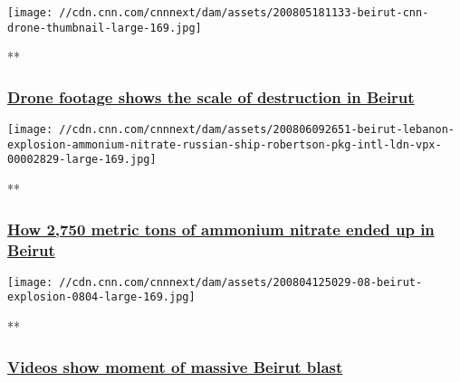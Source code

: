 \href{/videos/world/2020/08/05/beirut-explosion-lebanon-destruction-drone-video-lon-orig-bks.cnn/video/playlists/beirut-explosion/}{}

\texttt{[image: //cdn.cnn.com/cnnnext/dam/assets/200805181133-beirut-cnn-drone-thumbnail-large-169.jpg]}

**

\hypertarget{drone-footage-shows-the-scale-of-destruction-in-beirut}{%
\subsubsection{\texorpdfstring{\href{/videos/world/2020/08/05/beirut-explosion-lebanon-destruction-drone-video-lon-orig-bks.cnn/video/playlists/beirut-explosion/}{Drone
footage shows the scale of destruction in
Beirut}}{Drone footage shows the scale of destruction in Beirut}}\label{drone-footage-shows-the-scale-of-destruction-in-beirut}}

\href{/videos/world/2020/08/06/beirut-lebanon-explosion-ammonium-nitrate-russian-ship-robertson-pkg-intl-ldn-vpx.cnn/video/playlists/beirut-explosion/}{}

\texttt{[image: //cdn.cnn.com/cnnnext/dam/assets/200806092651-beirut-lebanon-explosion-ammonium-nitrate-russian-ship-robertson-pkg-intl-ldn-vpx-00002829-large-169.jpg]}

**

\hypertarget{how-2750-metric-tons-of-ammonium-nitrate-ended-up-in-beirut}{%
\subsubsection{\texorpdfstring{\href{/videos/world/2020/08/06/beirut-lebanon-explosion-ammonium-nitrate-russian-ship-robertson-pkg-intl-ldn-vpx.cnn/video/playlists/beirut-explosion/}{How
2,750 metric tons of ammonium nitrate ended up in
Beirut}}{How 2,750 metric tons of ammonium nitrate ended up in Beirut}}\label{how-2750-metric-tons-of-ammonium-nitrate-ended-up-in-beirut}}

\href{/videos/world/2020/08/04/beirut-explosion-moment-of-blast-witness-ctw-vpx.cnn/video/playlists/beirut-explosion/}{}

\texttt{[image: //cdn.cnn.com/cnnnext/dam/assets/200804125029-08-beirut-explosion-0804-large-169.jpg]}

**

\hypertarget{videos-show-moment-of-massive-beirut-blast}{%
\subsubsection{\texorpdfstring{\href{/videos/world/2020/08/04/beirut-explosion-moment-of-blast-witness-ctw-vpx.cnn/video/playlists/beirut-explosion/}{Videos
show moment of massive Beirut
blast}}{Videos show moment of massive Beirut blast}}\label{videos-show-moment-of-massive-beirut-blast}}

